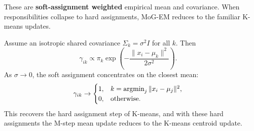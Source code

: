 \documentclass[../main]{subfiles}
\begin{document}
\begin{remark}
    These are \textbf{soft-assignment weighted} empirical mean and covariance.
    When responsibilities collapse to hard assignments, MoG-EM reduces to the
    familiar K-means updates.
\end{remark}

Assume an isotropic shared covariance $\Sigma_k=\sigma^2 I$ for all $k$. Then
\begin{equation}
    \gamma_{ik}
    \propto
    \pi_k \exp\left(-\frac{\|x_i-\mu_k\|^2}{2\sigma^2}\right).
\end{equation}
As $\sigma\to 0$, the soft assignment concentrates on the closest mean:
\begin{equation}
    \gamma_{ik}
    \to
    \begin{cases}
        1, & k=\mathop{\mathrm{argmin}}_j \|x_i-\mu_j\|^2,\\
        0, & \text{otherwise}.
    \end{cases}
\end{equation}
This recovers the hard assignment step of K-means, and with these hard
assignments the M-step mean update reduces to the K-means centroid update.
\end{document}
